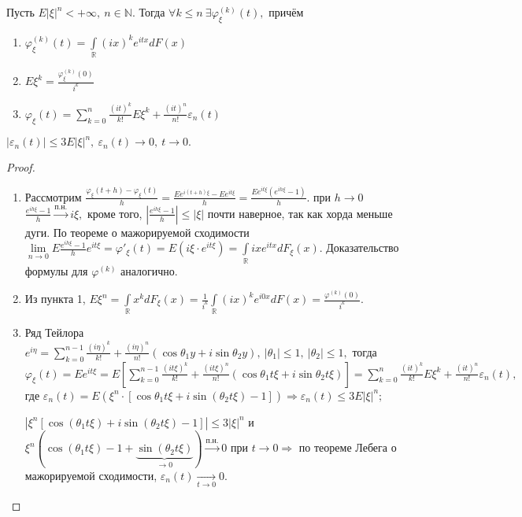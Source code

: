 	\begin{property}
	\begin{theorem}[о производных х.ф.]
		Пусть \(E|\xi|^n < + \infty, ~n \in \mathbb{N}.\) Тогда \(\forall k \leqslant n~ \exists \varphi_\xi^{(k)}(t),\) причём
		\begin{enumerate}
			\item \(\varphi_\xi^{(k)}(t) = \int\limits_\mathbb{R}(ix)^ke^{itx}dF(x)\)
			\item \(E\xi^k = \frac{\varphi_\xi^{(k)}(0)}{i^k}\)
			\item \(\varphi_\xi(t) = \sum\limits_{k = 0}^{n} \frac{(it)^k}{k!}E\xi^k + \frac{(it)^n}{n!}\varepsilon_n(t)\)
		\end{enumerate}
		\(|\varepsilon_n(t)| \leqslant 3E|\xi|^n, ~\varepsilon_n(t) \to 0, ~ t \to 0.\)
	\end{theorem}
	\begin{proof}
		\begin{enumerate}
			\item Рассмотрим \(\frac{\varphi_\xi(t + h) - \varphi_\xi(t)}{h} = \frac{Ee^{i(t + h)\xi} - Ee^{it\xi}}{h} = \frac{Ee^{it\xi}(e^{ih\xi} - 1)}{h}.\) при \(h \to 0\) \(\frac{e^{ih\xi} - 1}{h} \overset{\text{п.н.}}{\longrightarrow}i\xi,\) кроме того, \(\left|\frac{e^{ih\xi} - 1}{h}\right| \leqslant |\xi|\) почти наверное, так как хорда меньше дуги. По теореме о мажорируемой сходимости
			\(\lim\limits_{n \to 0}E \frac{e^{ih\xi} - 1}{h}e^{it\xi} = \varphi'_\xi(t) = E(i\xi\cdot e^{it\xi}) = \int\limits_\mathbb{R} ixe^{itx}dF_\xi(x).\) Доказательство формулы для \(\varphi^{(k)}\) аналогично.
			\item Из пункта 1, \(E\xi^n = \int\limits_\mathbb{R}x^k dF_\xi(x) = \frac{1}{i^k} \int\limits_\mathbb{R}(ix)^ke^{i0x}dF(x) = \frac{\varphi^{(k)}(0)}{i^k}.\)
			\item Ряд Тейлора \(e^{i\eta} = \sum\limits_{k = 0}^{n - 1} \frac{(i\eta)^k}{k!} + \frac{(i\eta)^n}{n!}(\cos\theta_1y + i\sin\theta_2 y), ~|\theta_1| \leqslant 1, ~ |\theta_2| \leqslant 1,\) тогда
			\(\varphi_\xi(t) = Ee^{it\xi} = E\left[\sum\limits_{k = 0}^{n - 1} \frac{(it\xi)^k}{k!} + \frac{(it\xi)^n}{n!}(\cos\theta_1 t\xi + i\sin \theta_2 t\xi)\right] = \sum\limits_{k = 0}^{n}\frac{(it)^k}{k!}E\xi^k + \frac{(it)^n}{n!}\varepsilon_n(t), \) где \(\varepsilon_n(t) = E(\xi^n\cdot [\cos\theta_1t\xi + i\sin(\theta_2 t\xi) - 1]) \Rightarrow \varepsilon_n(t) \leqslant 3E|\xi|^n;\)

			\(|\xi^n[\cos(\theta_1t\xi) + i\sin(\theta_2t\xi) - 1]| \leqslant3|\xi|^n\) и \(\xi^n(\cos(\theta_1t\xi) - 1 + \underbrace{\sin(\theta_2 t\xi)}_{\to 0}) \overset{\text{п.н.}}{\longrightarrow} 0\) при \(t \to 0 \Rightarrow\) по теореме Лебега о мажорируемой сходимости, \(\varepsilon_n(t) \underset{t \to 0}{\longrightarrow} 0.\)
		\end{enumerate}
	\end{proof}
	\end{property}
